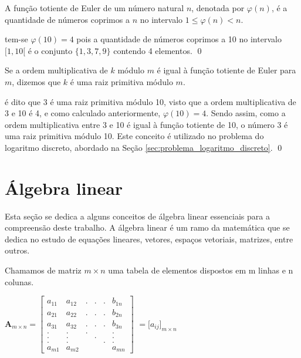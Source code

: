     \begin{definition}
        A função totiente de Euler de um número natural $n$, denotada por $\varphi(n)$, é a quantidade de números coprimos a $n$ no intervalo $1 \le \varphi(n) < n$.
    \end{definition}

    \begin{exemplo}
         tem-se $\varphi(10) = 4$ pois a quantidade de números coprimos a 10 no intervalo ${[}1,10{[}$ é o conjunto $\{1, 3, 7, 9\}$ contendo 4 elementos.
    \qed
    \end{exemplo}

    \begin{definition}
        Se a ordem multiplicativa de $k$ módulo $m$ é igual à função totiente de Euler para $m$, dizemos que $k$ é uma raiz primitiva módulo $m$.
    \end{definition}

    \begin{exemplo}
        é dito que 3 é uma raiz primitiva módulo 10, visto que a ordem multiplicativa de 3 e 10 é 4, e como calculado anteriormente, $\varphi(10) = 4$. Sendo assim, como a ordem multiplicativa entre 3 e 10 é igual à função totiente de 10, o número 3 é uma raiz primitiva módulo 10. Este conceito é utilizado no problema do logaritmo discreto, abordado na Seção \ref{sec:problema_logaritmo_discreto}.
    \qed
    \end{exemplo}

\pagebreak
\section{Álgebra linear}
Esta seção se dedica a alguns conceitos de álgebra linear essenciais para a compreensão deste trabalho. A álgebra linear é um ramo da matemática que se dedica no estudo de equações lineares, vetores, espaços vetoriais, matrizes, entre outros.

\begin{definition}[matriz]
    Chamamos de matriz $m \times n$ uma tabela de elementos dispostos em m linhas e n colunas.
\end{definition}

    \begin{center}
        $\textbf{A}_{m \times n} = \begin{bmatrix}
            a_{11} & a_{12} & . & . & . & b_{1n}\\
            a_{21} & a_{22} & . & . & . & b_{2n}\\
            a_{31} & a_{32} & . & . & . & b_{3n}\\
            .      & .      & . &   &   & .     \\
            .      & .      &   & . &   & .     \\
            .      & .      &   &   & . & .     \\
            a_{m1} & a_{m2} &   &   &   & a_{mn}
        \end{bmatrix}$
        $= {[}a_{ij}{]}_{m \times n}$
    \end{center}

